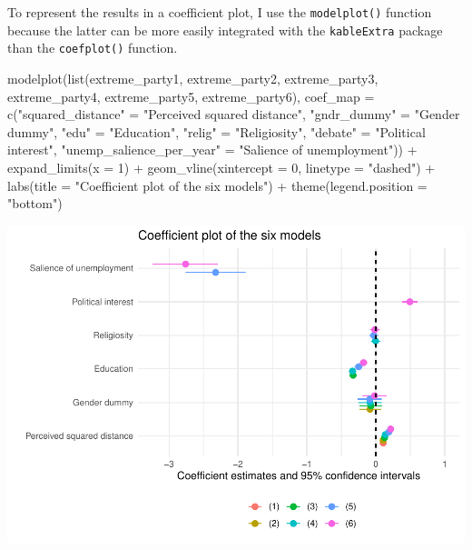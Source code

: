 \documentclass[
]{article}
\newenvironment{Shaded}{\begin{snugshade}}{\end{snugshade}}
\newcommand{\AttributeTok}[1]{\textcolor[rgb]{0.77,0.63,0.00}{#1}}
\newcommand{\DecValTok}[1]{\textcolor[rgb]{0.00,0.00,0.81}{#1}}
\newcommand{\FunctionTok}[1]{\textcolor[rgb]{0.00,0.00,0.00}{#1}}
\newcommand{\NormalTok}[1]{#1}
\newcommand{\OtherTok}[1]{\textcolor[rgb]{0.56,0.35,0.01}{#1}}
\newcommand{\SpecialCharTok}[1]{\textcolor[rgb]{0.00,0.00,0.00}{#1}}
\newcommand{\StringTok}[1]{\textcolor[rgb]{0.31,0.60,0.02}{#1}}
\begin{document}
To represent the results in a coefficient plot, I use the
\texttt{modelplot()} function because the latter can be more easily
integrated with the \texttt{kableExtra} package than the
\texttt{coefplot()} function.

\begin{Shaded}
\begin{Highlighting}[]
\FunctionTok{modelplot}\NormalTok{(}\FunctionTok{list}\NormalTok{(extreme\_party1, extreme\_party2, extreme\_party3, extreme\_party4, extreme\_party5, extreme\_party6),}
         \AttributeTok{coef\_map =} \FunctionTok{c}\NormalTok{(}\StringTok{"squared\_distance"} \OtherTok{=} \StringTok{"Perceived squared distance"}\NormalTok{, }
                      \StringTok{"gndr\_dummy"} \OtherTok{=} \StringTok{"Gender dummy"}\NormalTok{, }
                      \StringTok{"edu"} \OtherTok{=} \StringTok{"Education"}\NormalTok{, }
                      \StringTok{"relig"} \OtherTok{=} \StringTok{"Religiosity"}\NormalTok{, }
                      \StringTok{"debate"} \OtherTok{=} \StringTok{"Political interest"}\NormalTok{,}
                      \StringTok{"unemp\_salience\_per\_year"} \OtherTok{=} \StringTok{"Salience of unemployment"}\NormalTok{)) }\SpecialCharTok{+}
  \FunctionTok{expand\_limits}\NormalTok{(}\AttributeTok{x =} \DecValTok{1}\NormalTok{) }\SpecialCharTok{+}
  \FunctionTok{geom\_vline}\NormalTok{(}\AttributeTok{xintercept =} \DecValTok{0}\NormalTok{, }\AttributeTok{linetype =} \StringTok{"dashed"}\NormalTok{) }\SpecialCharTok{+}
  \FunctionTok{labs}\NormalTok{(}\AttributeTok{title =} \StringTok{"Coefficient plot of the six models"}\NormalTok{) }\SpecialCharTok{+}
  \FunctionTok{theme}\NormalTok{(}\AttributeTok{legend.position =} \StringTok{"bottom"}\NormalTok{)}
\end{Highlighting}
\end{Shaded}

\includegraphics{AVCD-Assignment2-Edenhofer_files/figure-latex/coefplots-extreme-choice-1.pdf}
\end{document}
